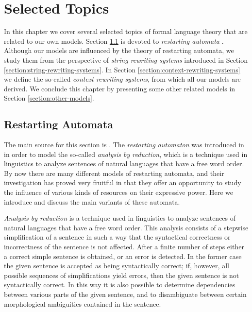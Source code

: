 \chapter{Selected Topics}
\label{chapter:advanced}

In this chapter we cover several selected topics of formal language theory that are related to our own models. Section \ref{section:restarting-automata} is devoted to \emph{restarting automata} \citep{O06}. Although our models are influenced by the theory of restarting automata, we study them from the perspective of \emph{string-rewriting systems} \citep{bookOtto93} introduced in Section \ref{section:string-rewriting-systems}. In Section \ref{section:context-rewriting-systems} we define the so-called \emph{context rewriting systems}, from which all our models are derived. We conclude this chapter by presenting some other related models in Section \ref{section:other-models}.

\section{Restarting Automata}
\label{section:restarting-automata}

The main source for this section is \citep{O06}. The \emph{restarting automaton} was introduced in \citep{JMPV95} in order to model the so-called \emph{analysis by reduction}, which is a technique used in linguistics to analyze sentences of natural languages that have a free word order. By now there are many different models of restarting automata, and their investigation has proved very fruitful in that they offer an opportunity to study the influence of various kinds of resources on their expressive power. Here we introduce and discuss the main variants of these automata.

\emph{Analysis by reduction} is a technique used in linguistics to analyze sentences of natural languages that have a free word order. This analysis consists of a stepwise simplification of a sentence in such a way that the syntactical correctness or incorrectness of the sentence is not affected. After a finite number of steps either a correct simple sentence is obtained, or an error is detected. In the former case the given sentence is accepted as being syntactically correct; if, however, all possible sequences of simplifications yield errors, then the given sentence is not syntactically correct. In this way it is also possible to determine dependencies between various parts of the given sentence, and to disambiguate between certain morphological ambiguities contained in the sentence.

